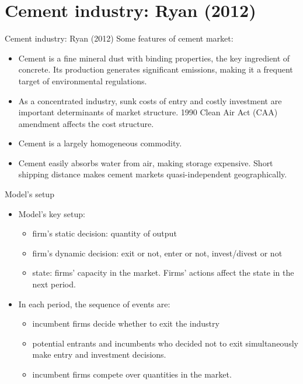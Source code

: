 \documentclass[aspectratio=169]{beamer}  %
\begin{document}
\section{Cement industry: Ryan (2012)}
\begin{frame}{Cement industry: Ryan (2012)}  
    Some features of cement market:
    \begin{itemize}
        \item Cement is a fine mineral dust with binding properties, the key ingredient of concrete. Its production generates significant emissions, making it a frequent target of environmental regulations.
        \item As a concentrated industry, sunk costs of entry and costly investment are important determinants of market structure. 1990 Clean Air Act (CAA) amendment affects the cost structure.
        \item Cement is a largely homogeneous commodity.
        \item Cement easily absorbs water from air, making storage expensive. Short shipping distance makes cement markets quasi-independent geographically.
    \end{itemize}
\end{frame}

\begin{frame}{Model's setup}    
    \begin{itemize}
        \item Model's key setup:
            \begin{itemize}
                \item firm's static decision: quantity of output
                \item firm's dynamic decision: exit or not, enter or not, invest/divest or not
                \item state: firms' capacity in the market. Firms' actions affect the state in the next period. 
            \end{itemize}
        \item In each period, the sequence of events are:
            \begin{itemize}
                \item incumbent firms decide whether to exit the industry
                \item potential entrants and incumbents who decided not to exit simultaneously make entry and investment decisions.
                \item incumbent firms compete over quantities in the market.
                
            \end{itemize}
  
    \end{itemize}
\end{frame}
\end{document}
